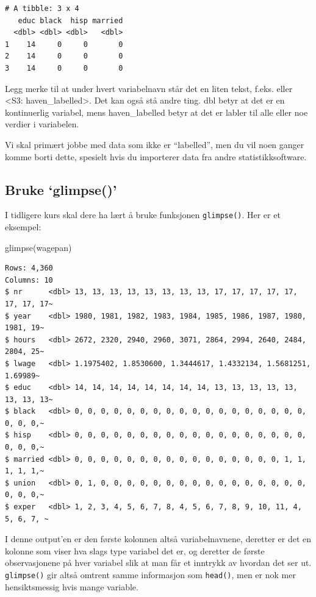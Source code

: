 \documentclass[
  norsk,
  letterpaper,
  DIV=11,
  numbers=noendperiod]{scrreprt}
\newenvironment{Shaded}{\begin{snugshade}}{\end{snugshade}}
\newcommand{\FunctionTok}[1]{\textcolor[rgb]{0.28,0.35,0.67}{#1}}
\newcommand{\NormalTok}[1]{\textcolor[rgb]{0.00,0.23,0.31}{#1}}
\theoremstyle{definition}
\theoremstyle{remark}
\begin{document}
\begin{verbatim}
# A tibble: 3 x 4
   educ black  hisp married
  <dbl> <dbl> <dbl>   <dbl>
1    14     0     0       0
2    14     0     0       0
3    14     0     0       0
\end{verbatim}

Legg merke til at under hvert variabelnavn står det en liten tekst,
f.eks. eller \textless S3: haven\_labelled\textgreater. Det kan også stå
andre ting. dbl betyr at det er en kontinuerlig variabel, mens
haven\_labelled betyr at det er labler til alle eller noe verdier i
variabelen.

Vi skal primært jobbe med data som ikke er ``labelled'', men du vil noen
ganger komme borti dette, spesielt hvis du importerer data fra andre
statistikksoftware.

\subsection{Bruke `glimpse()'}\label{bruke-glimpse}

I tidligere kurs skal dere ha lært å bruke funksjonen
\texttt{glimpse()}. Her er et eksempel:

\begin{Shaded}
\begin{Highlighting}[]
\FunctionTok{glimpse}\NormalTok{(wagepan)}
\end{Highlighting}
\end{Shaded}

\begin{verbatim}
Rows: 4,360
Columns: 10
$ nr      <dbl> 13, 13, 13, 13, 13, 13, 13, 13, 17, 17, 17, 17, 17, 17, 17, 17~
$ year    <dbl> 1980, 1981, 1982, 1983, 1984, 1985, 1986, 1987, 1980, 1981, 19~
$ hours   <dbl> 2672, 2320, 2940, 2960, 3071, 2864, 2994, 2640, 2484, 2804, 25~
$ lwage   <dbl> 1.1975402, 1.8530600, 1.3444617, 1.4332134, 1.5681251, 1.69989~
$ educ    <dbl> 14, 14, 14, 14, 14, 14, 14, 14, 13, 13, 13, 13, 13, 13, 13, 13~
$ black   <dbl> 0, 0, 0, 0, 0, 0, 0, 0, 0, 0, 0, 0, 0, 0, 0, 0, 0, 0, 0, 0, 0,~
$ hisp    <dbl> 0, 0, 0, 0, 0, 0, 0, 0, 0, 0, 0, 0, 0, 0, 0, 0, 0, 0, 0, 0, 0,~
$ married <dbl> 0, 0, 0, 0, 0, 0, 0, 0, 0, 0, 0, 0, 0, 0, 0, 0, 1, 1, 1, 1, 1,~
$ union   <dbl> 0, 1, 0, 0, 0, 0, 0, 0, 0, 0, 0, 0, 0, 0, 0, 0, 0, 0, 0, 0, 0,~
$ exper   <dbl> 1, 2, 3, 4, 5, 6, 7, 8, 4, 5, 6, 7, 8, 9, 10, 11, 4, 5, 6, 7, ~
\end{verbatim}

I denne output'en er den første kolonnen altså variabelnavnene, deretter
er det en kolonne som viser hva slags type variabel det er, og deretter
de første observasjonene på hver variabel slik at man får et inntrykk av
hvordan det ser ut. \texttt{glimpse()} gir altså omtrent samme
informasjon som \texttt{head()}, men er nok mer hensiktsmessig hvis
mange variable.
\end{document}
